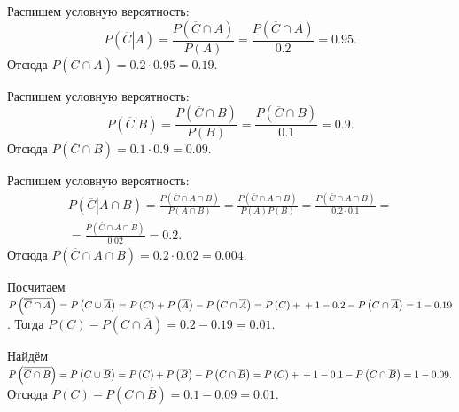 Распишем условную вероятность:
$$P \left( \left. \overline{C} \right| A \right) =
\frac{P \left( \overline{C} \cap A \right) }{P \left( A \right) } =
\frac{P \left( \overline{C} \cap A \right) }{0.2} =
0.95.$$
Отсюда $P \left( \overline{C} \cap A \right) = 0.2 \cdot 0.95 = 0.19$.

Распишем условную вероятность:
$$P \left( \left. \overline{C} \right| B \right) =
\frac{P \left( \overline{C} \cap B \right) }{P \left( B \right) } =
\frac{P \left( \overline{C} \cap B \right) }{0.1} =
0.9.$$
Отсюда $P \left( \overline{C} \cap B \right) = 0.1 \cdot 0.9 = 0.09$.

Распишем условную вероятность:
\begin{equation*}
\begin{split}
P \left( \left. \overline{C} \right| A \cap B \right) =
\frac{P \left( \overline{C} \cap A \cap B \right) }{P \left( A \cap B \right) } =
\frac{P \left( \overline{C} \cap A \cap B \right) }{P \left( A \right) P \left( B \right) } =
\frac{P \left( \overline{C} \cap A \cap B \right) }{0.2 \cdot 0.1} = \\
= \frac{P \left( \overline{C} \cap A \cap B \right) }{0.02} =
0.2.
\end{split}
\end{equation*}
Отсюда $P \left( \overline{C} \cap A \cap B \right) = 0.2 \cdot 0.02 = 0.004$.

Посчитаем
$P \left( \overline{ \overline{C} \cap A} \right) =
P \left( C \cup \overline{A} \right) =
P \left( C \right) + P \left( \overline{A} \right) - P \left( C \cap \overline{A} \right) =
P \left( C \right) + \\
+ 1 - 0.2 - P \left( C \cap \overline{A} \right) =
1 - 0.19$.
Тогда $P \left( C \right) - P \left( C \cap \overline{A} \right) = 0.2 - 0.19 = 0.01$.

Найдём
$P \left( \overline{ \overline{C} \cap B} \right) =
P \left( C \cup \overline{B} \right) =
P \left( C \right) + P \left( \overline{B} \right) - P \left( C \cap \overline{B} \right) =
P \left( C \right) + \\ + 1 - 0.1 - P \left( C \cap \overline{B} \right) =
1 - 0.09.$
Отсюда $P \left( C \right) - P \left( C \cap \overline{B} \right) = 0.1 - 0.09 = 0.01$.

